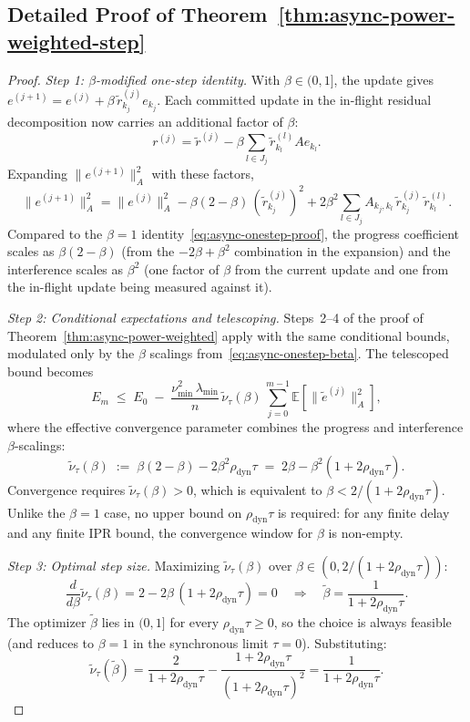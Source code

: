 \documentclass[pdflatex,sn-mathphys-num]{sn-jnl}%
\newcommand{\E}{\mathbb{E}}
\newcommand{\Anorm}[1]{\|#1\|_{A}}
\newcommand{\lmin}{\lambda_{\min}}
\theoremstyle{thmstyleone}%
\theoremstyle{thmstyletwo}%
\theoremstyle{thmstylethree}%
\begin{document}
\begin{appendices}

\section{Detailed Proof of Theorem~\ref{thm:async-power-weighted-step}}
\label{sect:detailed-proofs}
\begin{proof}
\label{proof:detailed-step-size}
\noindent\textit{Step 1: $\beta$-modified one-step identity.} With
$\beta \in (0, 1]$, the update gives
$e^{(j+1)} = e^{(j)} + \beta\,\tilde r_{k_j}^{(j)} e_{k_j}$. Each
committed update in the in-flight residual decomposition now carries an
additional factor of $\beta$:
\[
r^{(j)} = \tilde r^{(j)} - \beta \sum_{l \in J_j} \tilde r_{k_l}^{(l)} A e_{k_l}.
\]
Expanding $\Anorm{e^{(j+1)}}^2$ with these factors,
\begin{equation}
\label{eq:async-onestep-beta}
\Anorm{e^{(j+1)}}^2 = \Anorm{e^{(j)}}^2 - \beta(2-\beta)\,(\tilde r_{k_j}^{(j)})^2 + 2\beta^2 \sum_{l \in J_j} A_{k_j, k_l}\,\tilde r_{k_j}^{(j)}\,\tilde r_{k_l}^{(l)}.
\end{equation}
Compared to the $\beta = 1$ identity~\eqref{eq:async-onestep-proof}, the
progress coefficient scales as $\beta(2-\beta)$ (from the $-2\beta + \beta^2$
combination in the expansion) and the interference scales as $\beta^2$
(one factor of $\beta$ from the current update and one from the in-flight
update being measured against it).

\smallskip\noindent\textit{Step 2: Conditional expectations and
telescoping.} Steps~2--4 of the proof of
Theorem~\ref{thm:async-power-weighted} apply with the same conditional
bounds, modulated only by the $\beta$ scalings
from~\eqref{eq:async-onestep-beta}. The telescoped bound becomes
\[
E_m \;\leq\; E_0 \;-\; \frac{\nu_{\min}^2\,\lmin}{n}\,\tilde\nu_\tau(\beta)\,\sum_{j=0}^{m-1} \E[\Anorm{\tilde e^{(j)}}^2],
\]
where the effective convergence parameter combines the progress and
interference $\beta$-scalings:
\[
\tilde\nu_\tau(\beta) \;:=\; \beta(2-\beta) - 2\beta^2\rho_{\text{dyn}}\tau \;=\; 2\beta - \beta^2(1 + 2\rho_{\text{dyn}}\tau).
\]
Convergence requires $\tilde\nu_\tau(\beta) > 0$, which is equivalent to
$\beta < 2/(1 + 2\rho_{\text{dyn}}\tau)$. Unlike the $\beta = 1$ case,
no upper bound on $\rho_{\text{dyn}}\tau$ is required: for any finite
delay and any finite IPR bound, the convergence window for $\beta$ is
non-empty.

\smallskip\noindent\textit{Step 3: Optimal step size.} Maximizing
$\tilde\nu_\tau(\beta)$ over $\beta \in (0, 2/(1 + 2\rho_{\text{dyn}}\tau))$:
\[
\frac{d}{d\beta}\tilde\nu_\tau(\beta) = 2 - 2\beta\,(1 + 2\rho_{\text{dyn}}\tau) = 0 \quad\Longrightarrow\quad \tilde\beta = \frac{1}{1 + 2\rho_{\text{dyn}}\tau}.
\]
The optimizer $\tilde\beta$ lies in $(0, 1]$ for every
$\rho_{\text{dyn}}\tau \geq 0$, so the choice is always feasible (and
reduces to $\beta = 1$ in the synchronous limit $\tau = 0$). Substituting:
\[
\tilde\nu_\tau(\tilde\beta) = \frac{2}{1 + 2\rho_{\text{dyn}}\tau} - \frac{1 + 2\rho_{\text{dyn}}\tau}{(1 + 2\rho_{\text{dyn}}\tau)^2} = \frac{1}{1 + 2\rho_{\text{dyn}}\tau}.
\]


\end{proof}
\end{appendices}
\end{document}
